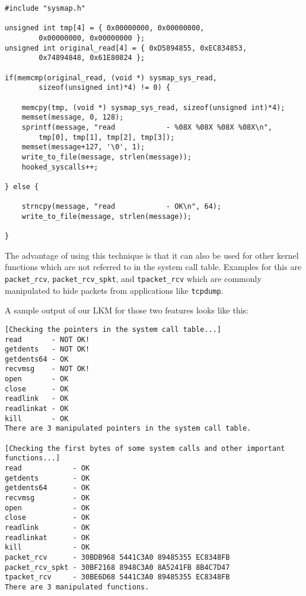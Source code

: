 \documentclass[10pt, letterpaper]{scrartcl}
\begin{document}
\begin{lstlisting}
#include "sysmap.h"

unsigned int tmp[4] = { 0x00000000, 0x00000000,
		0x00000000, 0x00000000 };
unsigned int original_read[4] = { 0xD5894855, 0xEC834853,
		0x74894848, 0x61E80824 };

if(memcmp(original_read, (void *) sysmap_sys_read,
		sizeof(unsigned int)*4) != 0) {
	
	memcpy(tmp, (void *) sysmap_sys_read, sizeof(unsigned int)*4);
	memset(message, 0, 128);
	sprintf(message, "read            - %08X %08X %08X %08X\n",
		tmp[0], tmp[1], tmp[2], tmp[3]);
	memset(message+127, '\0', 1);
	write_to_file(message, strlen(message));
	hooked_syscalls++;
	
} else {
	
	strncpy(message, "read            - OK\n", 64);
	write_to_file(message, strlen(message));
	
}
\end{lstlisting}

The advantage of using this technique is that it can also be used for other kernel functions which are not referred to in the system call table.
Examples for this are \texttt{packet\_rcv}, \texttt{packet\_rcv\_spkt}, and \texttt{tpacket\_rcv} which are commonly manipulated to hide packets from applications like \texttt{tcpdump}.

A sample output of our LKM for those two features looks like this:

\begin{lstlisting}
[Checking the pointers in the system call table...]
read       - NOT OK!
getdents   - NOT OK!
getdents64 - OK
recvmsg    - NOT OK!
open       - OK
close      - OK
readlink   - OK
readlinkat - OK
kill       - OK
There are 3 manipulated pointers in the system call table.

[Checking the first bytes of some system calls and other important functions...]
read            - OK
getdents        - OK
getdents64      - OK
recvmsg         - OK
open            - OK
close           - OK
readlink        - OK
readlinkat      - OK
kill            - OK
packet_rcv      - 30BDB968 5441C3A0 89485355 EC8348FB
packet_rcv_spkt - 30BF2168 8948C3A0 8A5241FB 8B4C7D47
tpacket_rcv     - 30BE6D68 5441C3A0 89485355 EC8348FB
There are 3 manipulated functions.
\end{lstlisting}
\end{document}
